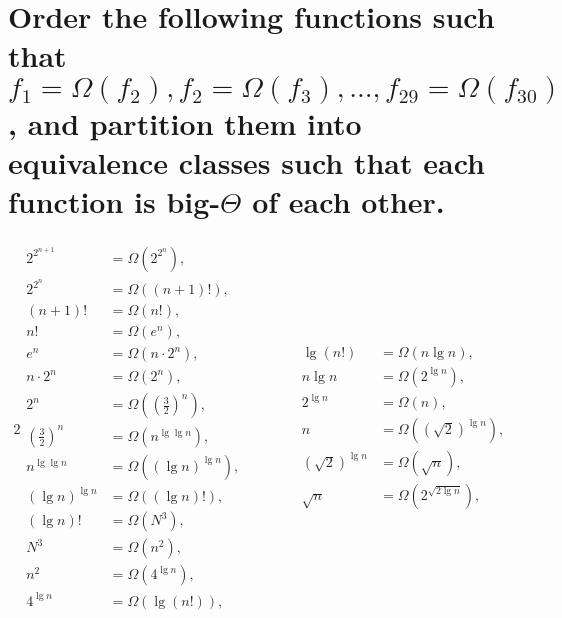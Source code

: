 \section[Problem 6]{Order the following functions such that $f_1 = \Omega(f_2), f_2 = \Omega(f_3), ..., f_{29} = \Omega(f_{30})$, and partition them into equivalence classes such that each function is big-$\Theta$ of each other.}

\begin{alignat*}{2}
	\begin{aligned}
		2^{2^{n + 1}} &= \Omega \left(2^{2^n} \right), \\
		2^{2^n} &= \Omega \left((n + 1)! \right), \\
		(n + 1)! &= \Omega \left(n! \right), \\
		n! &= \Omega \left(e^n \right), \\
		e^n &= \Omega \left(n \cdot 2^n \right), \\
		n \cdot 2^n &= \Omega \left(2^n \right), \\
		2^n &= \Omega \left(\left( \frac{3}{2} \right)^n \right), \\
		\left( \frac{3}{2} \right)^n &= \Omega \left(n^{\lg \lg n} \right), \\
		n^{\lg \lg n} &= \Omega \left(\left( \lg n \right)^{\lg n} \right), \\
		\left( \lg n \right)^{\lg n} &= \Omega \left((\lg n)! \right), \\
		(\lg n)! &= \Omega \left(N^3 \right), \\
		N^3 &= \Omega \left(n^2 \right), \\
		n^2 &= \Omega \left(4^{\lg n} \right), \\
		4^{\lg n} &= \Omega \left(\lg (n!) \right), \\
	\end{aligned}
	& \qquad &
	\begin{aligned}
		\lg (n!)  &= \Omega \left(n \lg n \right), \\
		n \lg n &= \Omega \left(2^{\lg n} \right), \\
		2^{\lg n} &= \Omega \left(n \right), \\
		n &= \Omega \left(\left( \sqrt{2} \right)^{\lg n} \right), \\
		\left( \sqrt{2} \right)^{\lg n} &= \Omega \left(\sqrt{n} \right), \\
		\sqrt{n} &= \Omega \left(2^{\sqrt{2 \lg n}} \right), \\

\end{aligned}
\end{alignat*}
